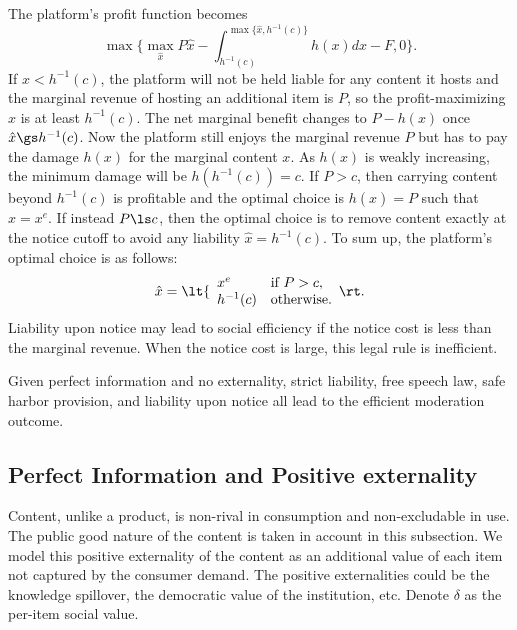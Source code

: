 The platform's profit function becomes
\begin{equation}\label{eqn:profit_lun}
    \max\{\max_{\hat{x}}P\hat{x} - \int_{h^{-1}(c)}^{\max\{\hat{x},h^{-1}(c)\}}h(x)dx-F, 0\}.
\end{equation}
If $\hat{x}<h^{-1}(c)$, the platform will not be held liable for any content it hosts and the marginal revenue of hosting an additional item is $P$, so the profit-maximizing $\hat{x}$ is at least $h^{-1}(c)$. The net marginal benefit changes to $P-h(x)$ once $\hat{x}\gs h^{-1}(c)$. Now the platform still enjoys the marginal revenue $P$ but has to pay the damage $h(x)$ for the marginal content $x$. As $h(x)$ is weakly increasing, the minimum damage will be $h(h^{-1}(c))=c$. 
If $P>c$, then carrying content beyond $h^{-1}(c)$ is profitable and the optimal choice is $h(\hat{x})=P$ such that $\hat{x}=x^e$. 
If instead $P\ls c$, then the optimal choice is to remove content exactly at the notice cutoff to avoid any liability $\hat{x}=h^{-1}(c)$. 
To sum up, the platform's optimal choice is as follows:
\begin{equation}
\hat{x}=
\lt\{\begin{array}{ll}
    x^e & \mbox{if $P>c$}, \\
    h^{-1}(c) & \mbox{otherwise}.
\end{array}\rt.
\end{equation}
Liability upon notice may lead to social efficiency if the notice cost is less than the marginal revenue. When the notice cost is large, this legal rule is inefficient.

\begin{proposition}
Given perfect information and no externality, strict liability, free speech law, safe harbor provision, and liability upon notice all lead to the efficient moderation outcome.
\end{proposition}

\subsection{Perfect Information and Positive externality}

Content, unlike a product, is non-rival in consumption and non-excludable in use. The public good nature of the content is taken in account in this subsection. 
We model this positive externality of the content as an additional value of each item not captured by the consumer demand. The positive externalities could be the knowledge spillover, the democratic value of the institution, etc.
Denote $\delta$ as the per-item social value.

